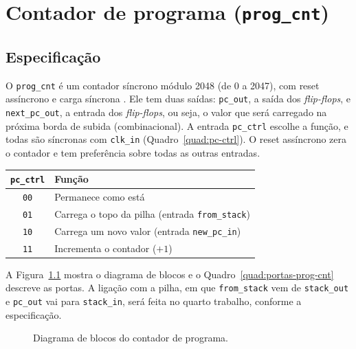 \chapter{Contador de programa (\texttt{prog\_cnt})}
\label{cap:prog_cnt}

\section{Especificação}

O \texttt{prog\_cnt} é um contador síncrono módulo 2048 (de 0 a 2047), com reset assíncrono e carga síncrona \cite{tp2}. Ele tem duas saídas: \texttt{pc\_out}, a saída dos \textit{flip-flops}, e \texttt{next\_pc\_out}, a entrada dos \textit{flip-flops}, ou seja, o valor que será carregado na próxima borda de subida (combinacional). A entrada \texttt{pc\_ctrl} escolhe a função, e todas são síncronas com \texttt{clk\_in} (Quadro~\ref{quad:pc-ctrl}). O reset assíncrono zera o contador e tem preferência sobre todas as outras entradas.

\begin{quadro}[htb]
  \caption{Funções do contador de programa, selecionadas por \texttt{pc\_ctrl}.}
  \label{quad:pc-ctrl}
  \centering
  \begin{tabular}{cl}
    \hline
    \texttt{pc\_ctrl} & Função \\ \hline
    \texttt{00} & Permanece como está \\
    \texttt{01} & Carrega o topo da pilha (entrada \texttt{from\_stack}) \\
    \texttt{10} & Carrega um novo valor (entrada \texttt{new\_pc\_in}) \\
    \texttt{11} & Incrementa o contador ($+1$) \\ \hline
  \end{tabular}
\end{quadro}

A Figura~\ref{fig:bloco-prog-cnt} mostra o diagrama de blocos e o Quadro~\ref{quad:portas-prog-cnt} descreve as portas. A ligação com a pilha, em que \texttt{from\_stack} vem de \texttt{stack\_out} e \texttt{pc\_out} vai para \texttt{stack\_in}, será feita no quarto trabalho, conforme a especificação.

\begin{figure}[htb]
\caption{Diagrama de blocos do contador de programa.}\label{fig:bloco-prog-cnt}
\centering
{}
\end{figure}


